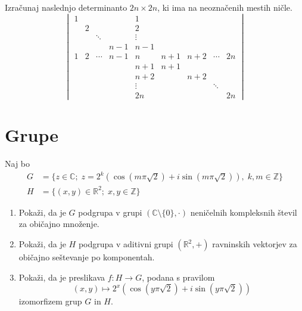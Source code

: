 \documentclass[a4paper,12pt]{article}
\begin{document}
Izračunaj naslednjo determinanto \(2n \times 2n\), ki ima na neoznačenih mestih ničle.
\[
\begin{vmatrix}
1   &   &        &     & 1   &     &       &        &    \\
    & 2 &        &     & 2   &     &       &        &    \\
    &   & \ddots &     & \vdots & &       &        &    \\
    &   &        & n-1 & n-1 &    &       &        &    \\
1   & 2 & \cdots & n-1 & n   & n+1 & n+2 & \cdots & 2n \\
    &   &        &     & n+1 & n+1 &      &       &    \\
    &   &        &     & n+2 &     & n+2  &       &    \\
    &   &        &     & \vdots & & & \ddots &    \\
    &   &        &     & 2n  &     &      &        & 2n
\end{vmatrix}
\]
%
%

\section*{Grupe}

Naj bo
\begin{align*}
G &= \{z\in\mathbb{C};\;z=2^k(\cos(m\pi\sqrt{2})+i\sin(m\pi\sqrt{2})),\;k,m\in\mathbb{Z}\}\\
H &= \{(x,y)\in\mathbb{R}^2;\;x,y\in\mathbb{Z}\}
\end{align*}
\begin{enumerate}
\item
Pokaži, da je \(G\) podgrupa v grupi \((\mathbb{C}\setminus\{0\},\cdot)\)
neničelnih kompleksnih števil za običajno množenje.

\item
Pokaži, da je \(H\) podgrupa v aditivni grupi \((\mathbb{R}^2,+)\)
ravninskih vektorjev za običajno seštevanje po komponentah.

\item
Pokaži, da je preslikava \(f:H\to G\), podana s pravilom
\[(x,y)\mapsto 2^x(\cos(y\pi\sqrt{2})+i\sin(y\pi\sqrt{2}))\]
izomorfizem grup \(G\) in \(H\).
\end{enumerate}
\end{document}
